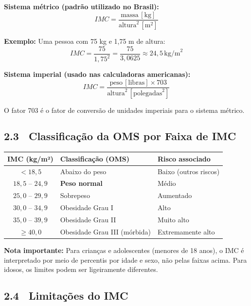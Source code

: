 \documentclass[12pt,a4paper]{article}
\begin{document}
\textbf{Sistema métrico (padrão utilizado no Brasil):}
\[
  \boxed{IMC = \frac{\text{massa} \, [\text{kg}]}{\text{altura}^2 \, [\text{m}^2]}}
\]

\textbf{Exemplo:} Uma pessoa com 75 kg e 1,75 m de altura:
\[
  IMC = \frac{75}{1{,}75^2} = \frac{75}{3{,}0625} \approx 24{,}5 \, \text{kg/m}^2
\]

\textbf{Sistema imperial (usado nas calculadoras americanas):}
\[
  IMC = \frac{\text{peso} \, [\text{libras}] \times 703}{\text{altura}^2 \, [\text{polegadas}^2]}
\]

O fator 703 é o fator de conversão de unidades imperiais para o sistema métrico.

\bigskip

\subsection*{2.3 \ Classificação da OMS por Faixa de IMC}

\begin{center}
\renewcommand{\arraystretch}{1.5}
\begin{tabular}{c l l}
  \toprule
  \textbf{IMC (kg/m²)} & \textbf{Classificação (OMS)} & \textbf{Risco associado} \\ \midrule
  $< 18{,}5$ & Abaixo do peso & Baixo (outros riscos) \\
  $18{,}5$ -- $24{,}9$ & \textcolor{ecogreen}{\bfseries Peso normal} & Médio \\
  $25{,}0$ -- $29{,}9$ & Sobrepeso & Aumentado \\
  $30{,}0$ -- $34{,}9$ & Obesidade Grau I & Alto \\
  $35{,}0$ -- $39{,}9$ & Obesidade Grau II & Muito alto \\
  $\geq 40{,}0$ & Obesidade Grau III (mórbida) & Extremamente alto \\ \bottomrule
\end{tabular}
\end{center}

\medskip
\textbf{Nota importante:} Para crianças e adolescentes (menores de 18 anos), o IMC
é interpretado por meio de percentis por idade e sexo, não pelas faixas acima.
Para idosos, os limites podem ser ligeiramente diferentes.

\bigskip

\subsection*{2.4 \ Limitações do IMC}
\end{document}
